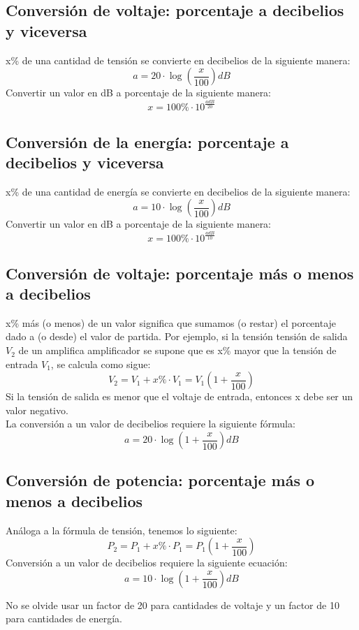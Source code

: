 \documentclass[
	12pt, %
	fleqn, %
	a4paper, %
	oneside, %
]{LegrandOrangeBook}
\begin{document}
\subsection{Conversión de voltaje: porcentaje a decibelios y viceversa}
x\% de una cantidad de tensión se convierte en decibelios de la siguiente manera:
\begin{equation}
a=20\cdot\log\left(\frac{x}{100}\right)dB
\end{equation}
Convertir un valor en dB a porcentaje de la siguiente manera:
\begin{equation}
x=100\%\cdot 10^{\frac{a dB}{20}}
\end{equation}
\subsection{Conversión de la energía: porcentaje a decibelios y viceversa}
x\% de una cantidad de energía se convierte en decibelios de la siguiente manera:
\begin{equation}
a=10\cdot\log\left(\frac{x}{100}\right)dB
\end{equation}
Convertir un valor en dB a porcentaje de la siguiente manera:
\begin{equation}
x=100\%\cdot 10^{\frac{a dB}{10}}
\end{equation}
\subsection{Conversión de voltaje: porcentaje más o menos a decibelios}
x\% más (o menos) de un valor significa que sumamos (o restar) el porcentaje dado a (o desde) el valor de partida. Por ejemplo, si la tensión tensión de salida $V_2$ de un amplifica amplificador se supone que es x\% mayor que la
tensión de entrada $V_1$, se calcula como sigue:
\begin{equation}
V_2=V_1 + x\%\cdot V_1= V_1\left(1+\frac{x}{100}\right)
\end{equation}
Si la tensión de salida es menor que el voltaje de entrada, entonces x debe ser un valor negativo.\\
La conversión a un valor de decibelios requiere la siguiente fórmula:
\begin{equation}
a=20\cdot\log\left(1+\frac{x}{100}\right)dB
\end{equation}
\subsection{Conversión de potencia: porcentaje más o menos a decibelios}
Análoga a la fórmula de tensión, tenemos lo siguiente:
\begin{equation}
P_2=P_1+x\%\cdot P_1= P_1\left(1+\frac{x}{100}\right)
\end{equation}
Conversión a un valor de decibelios requiere la siguiente ecuación:
\begin{equation}
a=10\cdot\log\left(1+\frac{x}{100}\right)dB
\end{equation}
\begin{remark}
No se olvide usar un factor de 20 para cantidades de voltaje y un factor de 10 para cantidades de energía.
\end{remark}
\end{document}
